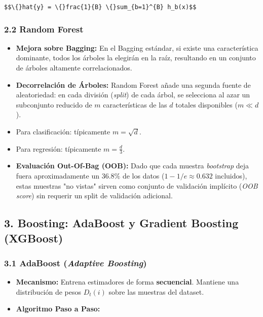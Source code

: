 \documentclass[11pt,oneside]{article}
\begin{document}
\texttt{\$\$\textbackslash\{\}hat\{y\} = \textbackslash\{\}frac\{1\}\{B\} \textbackslash\{\}sum\_\{b=1\}\textasciicircum{}\{B\} h\_b(x)\$\$}\\

\subsubsection{2.2 Random Forest}

\begin{itemize}

\item \textbf{Mejora sobre Bagging:} En el Bagging estándar, si existe una característica dominante, todos los árboles la elegirán en la raíz, resultando en un conjunto de árboles altamente correlacionados.

\item \textbf{Decorrelación de Árboles:} Random Forest añade una segunda fuente de aleatoriedad: en cada división (\emph{split}) de cada árbol, se selecciona al azar un subconjunto reducido de \(m\) características de las \(d\) totales disponibles (\(m \ll d\)).

\item Para clasificación: típicamente \(m = \sqrt{d}\).

\item Para regresión: típicamente \(m = \frac{d}{3}\).

\item \textbf{Evaluación Out-Of-Bag (OOB):} Dado que cada muestra \emph{bootstrap} deja fuera aproximadamente un \(36.8\%\) de los datos (\(1 - 1/e \approx 0.632\) incluidos), estas muestras "no vistas" sirven como conjunto de validación implícito (\emph{OOB score}) sin requerir un split de validación adicional.

\end{itemize}

\subsection{3. Boosting: AdaBoost y Gradient Boosting (XGBoost)}

\subsubsection{3.1 AdaBoost (\emph{Adaptive Boosting})}

\begin{itemize}

\item \textbf{Mecanismo:} Entrena estimadores de forma \textbf{secuencial}. Mantiene una distribución de pesos \(D_t(i)\) sobre las muestras del dataset.

\item \textbf{Algoritmo Paso a Paso:}

\end{itemize}
\end{document}
